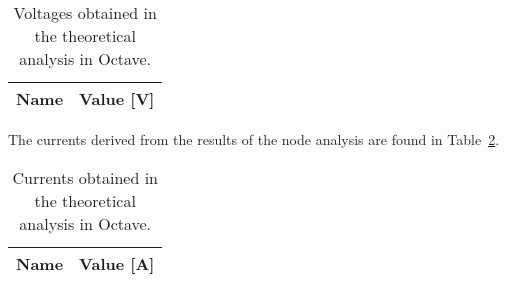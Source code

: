 \begin{table}[H]
  \centering
  \begin{tabular}{|l|r|}
    \hline    
    {\bf Name} & {\bf Value [V]} \\ \hline
	
  \end{tabular}
  \caption{Voltages obtained in the theoretical analysis in Octave.}
  \label{tab:octave_volt1}
\end{table}
The currents derived from the results of the node analysis are found in Table~\ref{tab:octave_currents1}.
\begin{table}[H]
  \centering
  \begin{tabular}{|l|r|}
    \hline    
    {\bf Name} & {\bf Value [A]} \\ \hline
	
  \end{tabular}
  \caption{Currents obtained in the theoretical analysis in Octave.}
  \label{tab:octave_currents1}
\end{table}

